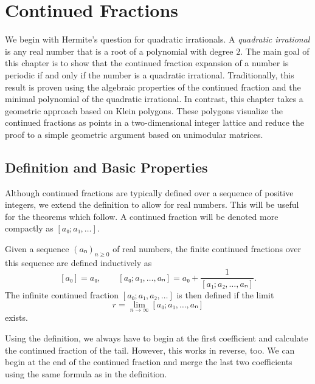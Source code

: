 \chapter{Continued Fractions}
\label{ch:quadratic}

We begin with Hermite's question for quadratic irrationals.
A \emph{quadratic irrational} is any real number
that is a root of a polynomial with degree $2$.
The main goal of this chapter is to show that the continued fraction expansion
of a number is periodic if and only if the number is a quadratic irrational.
Traditionally, this result is proven using the algebraic properties of the
continued fraction and the minimal polynomial of the quadratic irrational.
In contrast, this chapter takes a geometric approach based on Klein polygons.
These polygons visualize the continued fractions as points in a two-dimensional
integer lattice and reduce the proof to a simple geometric argument based on unimodular matrices.

\section{Definition and Basic Properties}
\label{sec:cf-def}

Although continued fractions are typically defined over a sequence of
positive integers, we extend the definition to allow for real numbers.
This will be useful for the theorems which follow.
A continued fraction will be denoted more compactly as $[a₀; a₁, …]$.

\begin{definition}
  \label{def:cont-frac}
  Given a sequence $(aₙ)_{n≥0}$ of real numbers, the finite continued
  fractions over this sequence are defined inductively as
  \[
    [a₀] = a₀, \qquad
    [a₀; a₁, …, aₙ] = a₀ + \frac{1}{[a₁; a₂, …, aₙ]}.
  \]
  The infinite continued fraction $[a₀; a₁, a₂, …]$ is then defined if the limit
  \[
    r = \lim_{n → ∞} [a₀; a₁, …, aₙ]
  \]
  exists.
\end{definition}

Using the definition,
we always have to begin at the first coefficient
and calculate the continued fraction of the tail.
However, this works in reverse, too.
We can begin at the end of the continued fraction
and merge the last two coefficients using the same formula as in the
definition.

